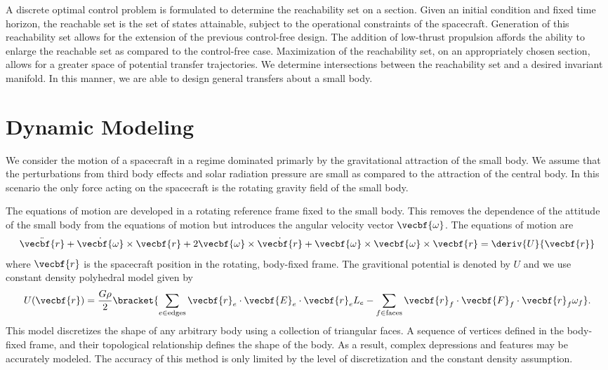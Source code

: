 \documentclass[letterpaper, preprint, paper,11pt]{AAS}	%
\begin{document}
A discrete optimal control problem is formulated to determine the reachability set on a \Poincare section.
Given an initial condition and fixed time horizon, the reachable set is the set of states attainable, subject to the operational constraints of the spacecraft. 
Generation of this reachability set allows for the extension of the previous control-free design. 
The addition of low-thrust propulsion affords the ability to enlarge the reachable set as compared to the control-free case.
Maximization of the reachability set, on an appropriately chosen \Poincare section, allows for a greater space of potential transfer trajectories.
We determine intersections between the reachability set and a desired invariant manifold.
In this manner, we are able to design general transfers about a small body.


\section{Dynamic Modeling}
We consider the motion of a spacecraft in a regime dominated primarly by the gravitational attraction of the small body. 
We assume that the perturbations from third body effects and solar radiation pressure are small as compared to the attraction of the central body. 
In this scenario the only force acting on the spacecraft is the rotating gravity field of the small body.

The equations of motion are developed in a rotating reference frame fixed to the small body.
This removes the dependence of the attitude of the small body from the equations of motion but introduces the angular velocity vector \( \vecbf{\omega}\).
The equations of motion are
\begin{align}
	\ddot{\vecbf{r}} + \dot{\vecbf{\omega}} \times \vecbf{r} + 2 \vecbf{\omega} \times \dot{\vecbf{r}} + \vecbf{\omega} \times \vecbf{\omega} \times \vecbf{r} = \deriv{U}{\vecbf{r}}
\end{align}
where \( \vecbf{r} \) is the spacecraft position in the rotating, body-fixed frame.
The gravitional potential is denoted by \( U \) and we use constant density polyhedral model given by
\begin{align}
	U(\vecbf{r}) = \frac{G \rho}{2} \bracket{ \sum_{e \in \text{edges}} \vecbf{r}_e \cdot \vecbf{E}_e \cdot \vecbf{r}_e L_e - \sum_{f\in \text{faces}} \vecbf{r}_f \cdot \vecbf{F}_f \cdot \vecbf{r}_f \omega_f} .
\end{align}
This model discretizes the shape of any arbitrary body using a collection of triangular faces. 
A sequence of vertices defined in the body-fixed frame, and their topological relationship defines the shape of the body. 
As a result, complex depressions and features may be accurately modeled.
The accuracy of this method is only limited by the level of discretization and the constant density assumption.
\end{document}

